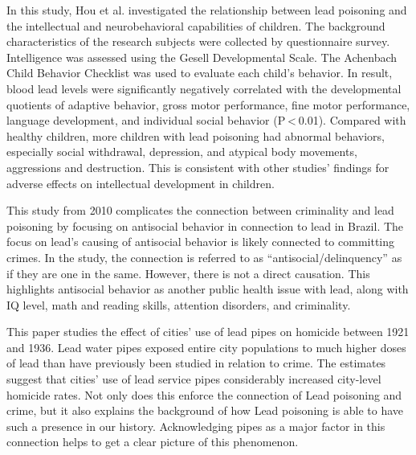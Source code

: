 \documentclass{article}
\begin{document}
\medskip

\noindent {}

\medskip

In this study, Hou et al. investigated the relationship between lead poisoning and the intellectual and neurobehavioral capabilities of children. The background characteristics of the research subjects were collected by questionnaire survey. Intelligence was assessed using the Gesell Developmental Scale. The Achenbach Child Behavior Checklist was used to evaluate each child’s behavior. In result, blood lead levels were significantly negatively correlated with the developmental quotients of adaptive behavior, gross motor performance, fine motor performance, language development, and individual social behavior (P < 0.01). Compared with healthy children, more children with lead poisoning had abnormal behaviors, especially social withdrawal, depression, and atypical body movements, aggressions and destruction. This is consistent with other studies' findings for adverse effects on intellectual development in children.

\medskip

\noindent {}

\medskip

This study from 2010 complicates the connection between criminality and lead poisoning by focusing on antisocial behavior in connection to lead in Brazil. The focus on lead’s causing of antisocial behavior is likely connected to committing crimes. In the study, the connection is referred to as ``antisocial/delinquency'' as if they are one in the same. However, there is not a direct causation. This highlights antisocial behavior as another public health issue with lead, along with IQ level, math and reading skills, attention disorders, and criminality. 

\medskip

\noindent {}

\medskip

This paper studies the effect of cities' use of lead pipes on homicide between 1921 and 1936. Lead water pipes exposed entire city populations to much higher doses of lead than have previously been studied in relation to crime. The estimates suggest that cities’ use of lead service pipes considerably increased city-level homicide rates. Not only does this enforce the connection of Lead poisoning and crime, but it also explains the background of how Lead poisoning is able to have such a presence in our history. Acknowledging pipes as a major factor in this connection helps to get a clear picture of this phenomenon. 





%
\end{document}

